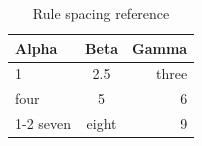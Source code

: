 \documentclass[10pt]{article}
\begin{document}
\begin{table}[htbp]
  \centering
  \caption{Rule spacing reference}
  \label{tab:rules}
  \begin{tabular}{lcr}
    \toprule
    Alpha & Beta & Gamma \\
    \midrule
    1 & 2.5 & three \\
    four & 5 & 6 \\
    \cmidrule(lr){1-2}
    seven & eight & 9 \\
    \bottomrule
  \end{tabular}
\end{table}
\end{document}
